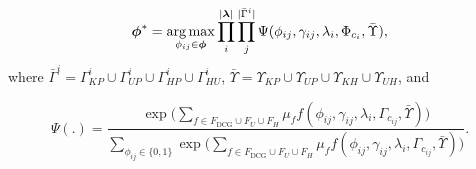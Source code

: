 \begin{equation}
\boldsymbol{\phi}^* = \operatorname*{\arg\max}_{\phi_{ij} \in \boldsymbol{\phi}} \prod_{i}^{|\boldsymbol\lambda|} \prod_j^{|\bar\Gamma^i|} \Psi(\phi_{ij},\gamma_{ij},\lambda_i,\Phi_{c_{i}},\bar\Upsilon),
\label{eq:dcg_upup_away_llm1}
\end{equation}
where ${\bar{\Gamma}^i = \Gamma^i_{KP} \cup \Gamma^i_{UP} \cup \Gamma^i_{HP} \cup \Gamma^i_{HU}}$, $\bar\Upsilon = \Upsilon_{KP} \cup \Upsilon_{UP} \cup \Upsilon_{KH} \cup \Upsilon_{UH}$, and 

\begin{equation}
\Psi(.) = \frac{\exp \Big( \sum\limits_{f \in F_{\text{DCG}} \cup F_{U} \cup F_{H}} \mu_f f(\phi_{ij},\gamma_{ij},\lambda_i,\Gamma_{c_{ij}},\bar\Upsilon) \Big)}{\sum\limits_{\phi_{ij} \in \{0,1\}}\exp \Big( \sum\limits_{f \in F_{\text{DCG}} \cup F_{U} \cup F_{H}} \mu_f f(\phi_{ij},\gamma_{ij},\lambda_i,\Gamma_{c_{ij}},\bar\Upsilon) \Big)}.
\label{eq:dcg_upup_away_factor}
\end{equation}
%


